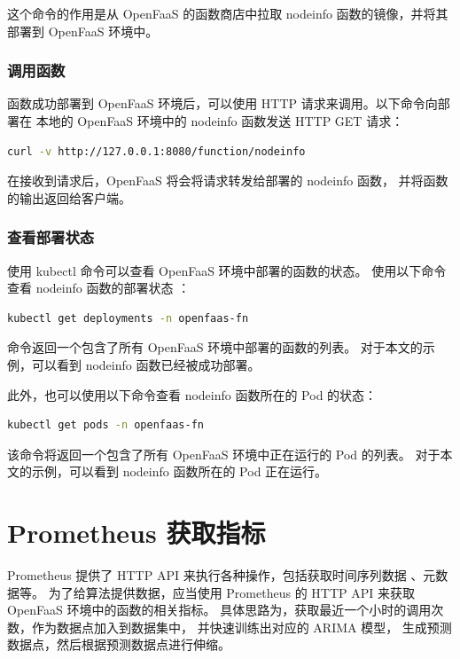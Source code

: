 \documentclass[a4paper,AutoFakeBold,oneside,12pt]{book}
\begin{document}
这个命令的作用是从 OpenFaaS 的函数商店中拉取 nodeinfo 函数的镜像，并将其部署到 OpenFaaS 环境中。

\subsubsection{调用函数}

函数成功部署到 OpenFaaS 环境后，可以使用 HTTP 请求来调用。以下命令向部署在
本地的 OpenFaaS 环境中的 nodeinfo 函数发送 HTTP GET 请求：

\begin{lstlisting}[language=bash]
curl -v http://127.0.0.1:8080/function/nodeinfo
\end{lstlisting}

在接收到请求后，OpenFaaS 将会将请求转发给部署的 nodeinfo 函数，
并将函数的输出返回给客户端。

\subsubsection{查看部署状态}

使用 kubectl 命令可以查看 OpenFaaS 环境中部署的函数的状态。
使用以下命令查看 nodeinfo 函数的部署状态 \cite{kubernetes_deployment_2023}：

\begin{lstlisting}[language=bash]
kubectl get deployments -n openfaas-fn
\end{lstlisting}

命令返回一个包含了所有 OpenFaaS 环境中部署的函数的列表。
对于本文的示例，可以看到 nodeinfo 函数已经被成功部署。

此外，也可以使用以下命令查看 nodeinfo 函数所在的 Pod 的状态：

\begin{lstlisting}[language=bash]
kubectl get pods -n openfaas-fn
\end{lstlisting}

该命令将返回一个包含了所有 OpenFaaS 环境中正在运行的 Pod 的列表。
对于本文的示例，可以看到 nodeinfo 函数所在的 Pod 正在运行。

\section{Prometheus 获取指标}

Prometheus 提供了 HTTP API 来执行各种操作，包括获取时间序列数据
、元数据等\cite{prometheus_api_2023}。
为了给算法提供数据，应当使用 Prometheus 的 HTTP API 来获取 
OpenFaaS 环境中的函数的相关指标。
具体思路为，获取最近一个小时的调用次数，作为数据点加入到数据集中，
并快速训练出对应的 ARIMA 模型，
生成预测数据点，然后根据预测数据点进行伸缩。
\end{document}
